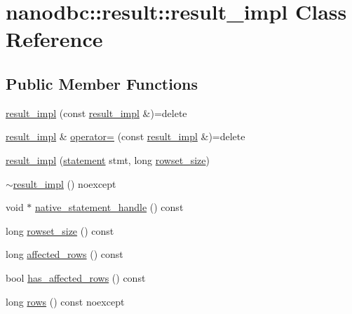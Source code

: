 \hypertarget{classnanodbc_1_1result_1_1result__impl}{}\section{nanodbc\+::result\+::result\+\_\+impl Class Reference}
\label{classnanodbc_1_1result_1_1result__impl}
\subsection*{Public Member Functions}
\begin{DoxyCompactItemize}
\item 
\mbox{\hyperlink{classnanodbc_1_1result_1_1result__impl_a14b32bc4ecc2c0dc5a3301bf90eb8c57}{result\+\_\+impl}} (const \mbox{\hyperlink{classnanodbc_1_1result_1_1result__impl}{result\+\_\+impl}} \&)=delete
\item 
\mbox{\hyperlink{classnanodbc_1_1result_1_1result__impl}{result\+\_\+impl}} \& \mbox{\hyperlink{classnanodbc_1_1result_1_1result__impl_a7d9a2633f816d1f36879cd3346c9d5fb}{operator=}} (const \mbox{\hyperlink{classnanodbc_1_1result_1_1result__impl}{result\+\_\+impl}} \&)=delete
\item 
\mbox{\hyperlink{classnanodbc_1_1result_1_1result__impl_a774aa9e2f965c0031f9191412a367b4f}{result\+\_\+impl}} (\mbox{\hyperlink{classnanodbc_1_1statement}{statement}} stmt, long \mbox{\hyperlink{classnanodbc_1_1result_1_1result__impl_ae924690b96c815adbf9979baba029e69}{rowset\+\_\+size}})
\item 
\mbox{\hyperlink{classnanodbc_1_1result_1_1result__impl_a20f05a147bbf42d1d3328bd7e0158752}{$\sim$result\+\_\+impl}} () noexcept
\item 
void $\ast$ \mbox{\hyperlink{classnanodbc_1_1result_1_1result__impl_aabeefd80e9e06b244e739c0ff182353f}{native\+\_\+statement\+\_\+handle}} () const
\item 
long \mbox{\hyperlink{classnanodbc_1_1result_1_1result__impl_ae924690b96c815adbf9979baba029e69}{rowset\+\_\+size}} () const
\item 
long \mbox{\hyperlink{classnanodbc_1_1result_1_1result__impl_ac90bfd9e75f6f872ca0d102971878f30}{affected\+\_\+rows}} () const
\item 
bool \mbox{\hyperlink{classnanodbc_1_1result_1_1result__impl_aae61bada1463697fc6a1b070c99d2be0}{has\+\_\+affected\+\_\+rows}} () const
\item 
long \mbox{\hyperlink{classnanodbc_1_1result_1_1result__impl_a5b821a102ab998eb887155be94f773d7}{rows}} () const noexcept

\end{DoxyCompactItemize}
